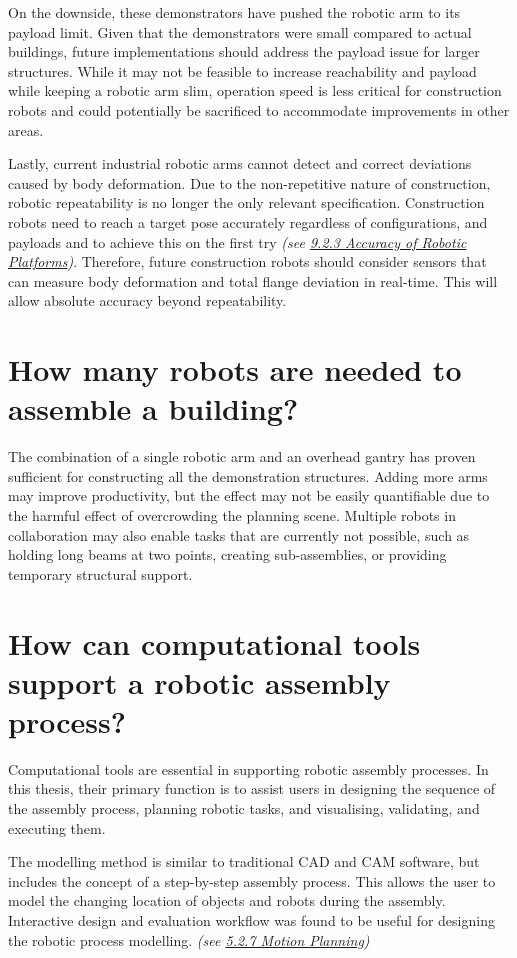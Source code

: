 \documentclass[11pt]{book}
\begin{document}
On the downside, these demonstrators have pushed the robotic arm to its payload limit. Given that the demonstrators were small compared to actual buildings, future implementations should address the payload issue for larger structures. While it may not be feasible to increase reachability and payload while keeping a robotic arm slim, operation speed is less critical for construction robots and could potentially be sacrificed to accommodate improvements in other areas.

Lastly, current industrial robotic arms cannot detect and correct deviations caused by body deformation. Due to the non-repetitive nature of construction, robotic repeatability is no longer the only relevant specification. Construction robots need to reach a target pose accurately regardless of configurations, and payloads and to achieve this on the first try \textit{(see \uline{9.2.3 Accuracy of Robotic Platforms})}. Therefore, future construction robots should consider sensors that can measure body deformation and total flange deviation in real-time. This will allow absolute accuracy beyond repeatability. 

\section{How many robots are needed to assemble a building?}

The combination of a single robotic arm and an overhead gantry has proven sufficient for constructing all the demonstration structures. Adding more arms may improve productivity, but the effect may not be easily quantifiable due to the harmful effect of overcrowding the planning scene. Multiple robots in collaboration may also enable tasks that are currently not possible, such as holding long beams at two points, creating sub-assemblies, or providing temporary structural support.

\section{How can computational tools support a robotic assembly process?}

Computational tools are essential in supporting robotic assembly processes. In this thesis, their primary function is to assist users in designing the sequence of the assembly process, planning robotic tasks, and visualising, validating, and executing them. 

The modelling method is similar to traditional CAD and CAM software, but includes the concept of a step-by-step assembly process. This allows the user to model the changing location of objects and robots during the assembly. Interactive design and evaluation workflow was found to be useful for designing the robotic process modelling. \textit{(see \uline{5.2.7 Motion Planning})}
\end{document}
